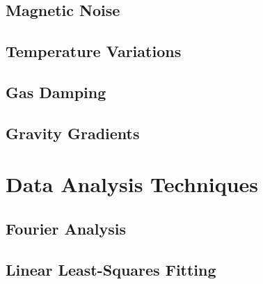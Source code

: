 \documentclass{book}
\begin{document}
\section{Magnetic Noise}
\section{Temperature Variations}
\section{Gas Damping} \label{gas}
\section{Gravity Gradients}\label{gravGrad}

\chapter{Data Analysis Techniques}
\section{Fourier Analysis}
\section{Linear Least-Squares Fitting}



\end{document}
